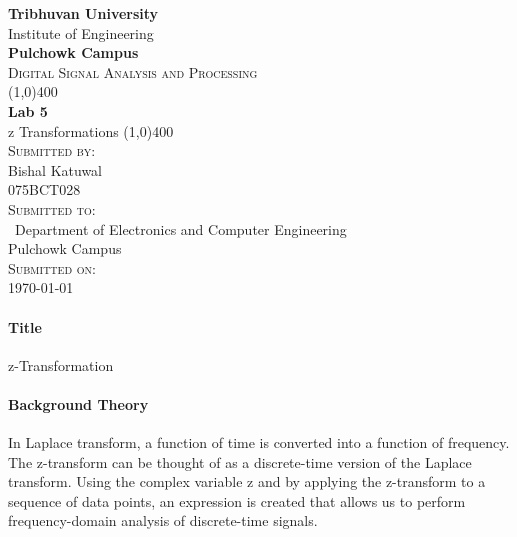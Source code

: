 \documentclass[12pt]{article}
\begin{document}
\begin{titlepage}
    \begin{center}
        \huge{\bfseries  Tribhuvan University}\\
        \Large{Institute of Engineering}\\
        \huge{ \bfseries  Pulchowk Campus}\\[3.2cm]


        \textsc{\Large Digital Signal Analysis and Processing}\\[-0.5cm]
        \line(1,0){400}\\
        \huge{\bfseries Lab 5}\\
        \huge{z Transformations}
        \line(1,0){400}\\


        \textsc{\Large Submitted by:}\\
        \Large Bishal Katuwal\\ \large 075BCT028\\    [0.85cm]

        \textsc{\Large Submitted to:}\\\
        \large Department of Electronics and Computer Engineering\\Pulchowk Campus\\    [0.85cm]
        
        \textsc{\Large Submitted on:}\\
        \today
        
    \end{center}
\end{titlepage}
\pagebreak
\paragraph{Title\\}
z-Transformation
\paragraph{Background Theory\\}


In Laplace transform, a function of time is converted into a function of frequency. 
The z-transform can be thought of as a discrete-time version of the Laplace transform. 
Using the complex variable z and by applying the z-transform to a sequence of data points, 
an expression is created that allows us to perform frequency-domain analysis of discrete-time signals.
\end{document}
